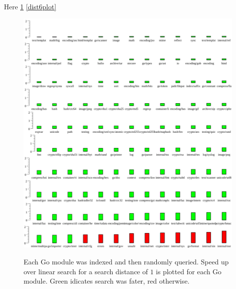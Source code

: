Here \ref{dist1plot} \ref{dist6plot}
\begin{figure}
    \includegraphics[width=\textwidth]{example1.png}
    \label{dist1plot}
    \centering
    \caption{Each Go module was indexed and then randomly queried.
    Speed up over linear search for a search distance of $1$ is plotted for each Go module.
    Green idicates search was fater, red otherwise.}
\end{figure}
